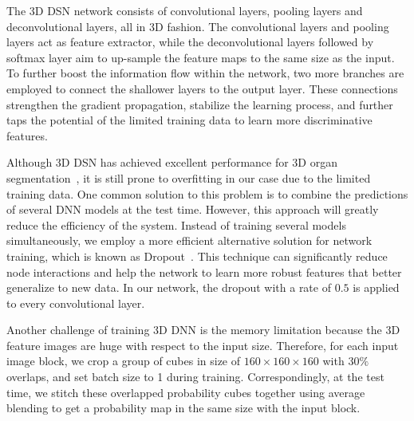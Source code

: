 The 3D DSN network consists of convolutional layers, pooling layers and deconvolutional layers, all in 3D fashion. The convolutional layers and pooling layers act as feature extractor, while the deconvolutional layers followed by softmax layer aim to up-sample the feature maps to the same size as the input. To further boost the information flow within the network, two more branches are employed to connect the shallower layers to the output layer. These connections strengthen the gradient propagation, stabilize the learning process, and further taps the potential of the limited training data to learn more discriminative features. %


Although 3D DSN has achieved excellent performance for 3D organ segmentation~\cite{Dou2017}, it is still prone to overfitting in our case due to the limited training data.
One common solution to this problem is to combine the predictions of several DNN models at the test time. However, this approach will greatly reduce the efficiency of the system.
Instead of training several models simultaneously, we employ a more efficient alternative solution for network training, which is known as Dropout~\cite{Srivastava2014}.
This technique can significantly reduce node interactions and help the network to learn more robust features that better generalize to new data.
In our network, the dropout with a rate of $0.5$ is applied to every convolutional layer.


Another challenge of training 3D DNN is the memory limitation because the 3D feature images are huge with respect to the input size. Therefore, for each input image block, we crop a group of cubes in size of $160\times 160\times 160$ with $30\%$ overlaps, and set batch size to 1 during training. Correspondingly, at the test time, we stitch these overlapped probability cubes together using average blending to get a probability map in the same size with the input block.


